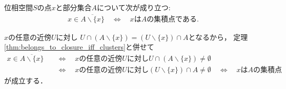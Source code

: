	\begin{screen}
		\begin{thm}
			位相空間$S$の点$x$と部分集合$A$について次が成り立つ:
			\begin{align}
				x \in \overline{A \backslash \{x\}} \quad \Longleftrightarrow \quad
				\mbox{$x$は$A$の集積点である}.
			\end{align}
		\end{thm}
	\end{screen}
	
	\begin{prf}
		$x$の任意の近傍$U$に対し
		$U \cap (A \backslash \{x\}) = (U \backslash \{x\}) \cap A$となるから，
		定理\ref{thm:belongs_to_closure_iff_clusters}と併せて
		\begin{align}
			x \in \overline{A \backslash \{x\}} 
			&\quad \Longleftrightarrow \quad
			\mbox{$x$の任意の近傍$U$に対し$U \cap (A \backslash \{x\}) \neq \emptyset$} \\
			&\quad \Longleftrightarrow \quad
			\mbox{$x$の任意の近傍$U$に対し$(U \backslash \{x\}) \cap A \neq \emptyset$}
			\quad \Longleftrightarrow \quad
			\mbox{$x$は$A$の集積点}
		\end{align}
		が成立する．
		\QED
	\end{prf}